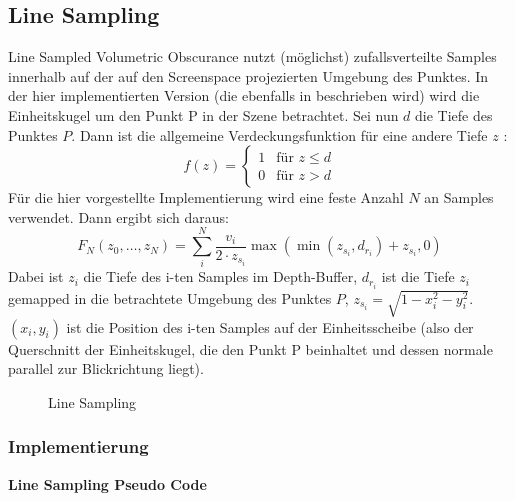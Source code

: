 \documentclass[runningheaders,a4paper]{llncs}
\begin{document}
\subsection{Line Sampling}
Line Sampled Volumetric Obscurance nutzt (möglichst) zufallsverteilte Samples innerhalb auf der auf den
Screenspace projezierten Umgebung des Punktes. In der hier implementierten Version (die ebenfalls in
\cite{voPaper} beschrieben wird) wird die Einheitskugel um den Punkt P in der Szene betrachtet.
Sei nun $d$ die Tiefe des Punktes $P$. Dann ist die allgemeine Verdeckungsfunktion für eine andere Tiefe
$z$ :
$$
f(z) = \begin{cases} 1 &  \text{für } z \leq d \\ 0 & \text{für } z > d \end{cases}
$$
Für die hier vorgestellte Implementierung wird eine feste Anzahl $N$ an Samples verwendet.
Dann ergibt sich daraus:
$$
F_{N}(z_0, \dots, z_N) = \sum_i^N \frac{v_i}{2 \cdot z_{s_i}} \max{(\min{(z_{s_i}, d_{r_i})} + z_{s_i}, 0)}
$$
Dabei ist $z_i$ die Tiefe des i-ten Samples im Depth-Buffer, $d_{r_i}$ ist die Tiefe $z_i$ gemapped in die
betrachtete Umgebung des Punktes $P$, $z_{s_i} = \sqrt{1 - x_i^2 - y_i^2}$. $(x_i, y_i)$ ist die Position des
i-ten Samples auf der Einheitsscheibe (also der Querschnitt der Einheitskugel, die den Punkt P 
beinhaltet und dessen normale parallel zur Blickrichtung liegt). \newline

\begin{figure}
	\centering

	
	\label{ref:lineSample}

	\caption{Line Sampling}
\end{figure}

\subsubsection{Implementierung}
	\textbf{Line Sampling Pseudo Code}\\
	\begin{algorithm}[H]
		
		
		
		
	\end{algorithm}
\end{document}
